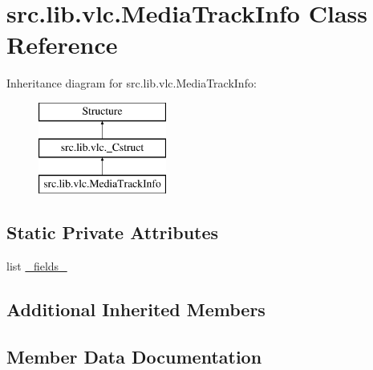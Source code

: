 \hypertarget{classsrc_1_1lib_1_1vlc_1_1MediaTrackInfo}{}\section{src.\+lib.\+vlc.\+Media\+Track\+Info Class Reference}
\label{classsrc_1_1lib_1_1vlc_1_1MediaTrackInfo}
Inheritance diagram for src.\+lib.\+vlc.\+Media\+Track\+Info\+:\begin{figure}[H]
\begin{center}
\leavevmode
\includegraphics[height=3.000000cm]{classsrc_1_1lib_1_1vlc_1_1MediaTrackInfo}
\end{center}
\end{figure}
\subsection*{Static Private Attributes}
\begin{DoxyCompactItemize}
\item 
list \hyperlink{classsrc_1_1lib_1_1vlc_1_1MediaTrackInfo_a444f39463dae0df3bc71919b71f4afcd}{\+\_\+fields\+\_\+}
\end{DoxyCompactItemize}
\subsection*{Additional Inherited Members}


\subsection{Member Data Documentation}
\hypertarget{classsrc_1_1lib_1_1vlc_1_1MediaTrackInfo_a444f39463dae0df3bc71919b71f4afcd}{}
